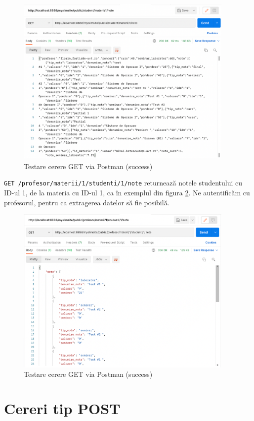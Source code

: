 \documentclass{report}
\begin{document}
\begin{figure}[h!]
    \centering
    \includegraphics[width=300pt]{img/GET_OK1.png}
    \caption{Testare cerere GET via Postman (success)}
    \label{GET_POSTMAN_OK}
\end{figure}
\newpage 
\texttt{GET /profesor/materii/1/studenti/1/note} returnează notele studentului cu ID-ul 1, de la materia cu ID-ul 1, ca în exemplul din figura \ref{GET_POSTMAN_OK2}. Ne autentificăm cu profesorul, pentru ca extragerea datelor să fie posibilă.

\begin{figure}[h!]
    \centering
    \includegraphics[width=300pt]{img/GET_OK.png}
    \caption{Testare cerere GET via Postman (success)}
    \label{GET_POSTMAN_OK2}
\end{figure}




\section{Cereri tip POST}
\end{document}
